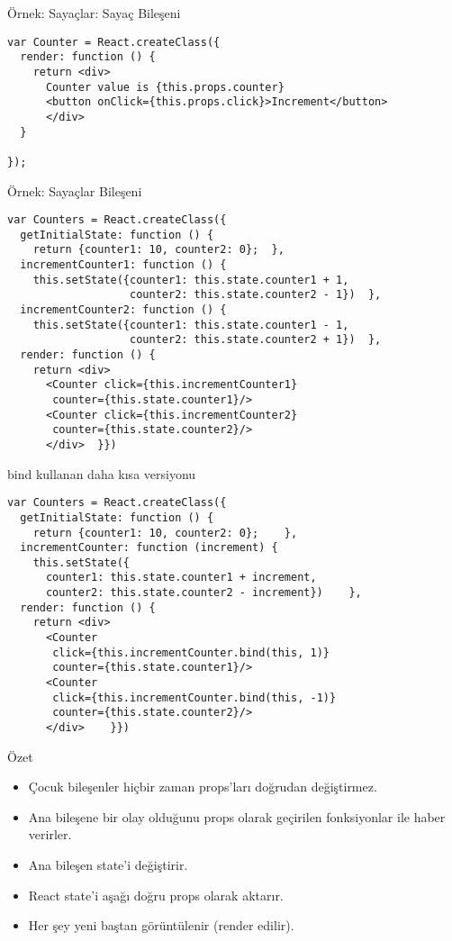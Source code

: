 \documentclass[presentation]{beamer}
\begin{document}
\begin{frame}[fragile,label=sec-5]{Örnek: Sayaçlar: Sayaç Bileşeni}
 \begin{verbatim}
var Counter = React.createClass({
  render: function () {
    return <div>
      Counter value is {this.props.counter}
      <button onClick={this.props.click}>Increment</button>
      </div>
  }

});
\end{verbatim}
\end{frame}

\begin{frame}[fragile,label=sec-6]{Örnek: Sayaçlar Bileşeni}
 \begin{verbatim}
var Counters = React.createClass({
  getInitialState: function () {
    return {counter1: 10, counter2: 0};  },
  incrementCounter1: function () {
    this.setState({counter1: this.state.counter1 + 1,
                   counter2: this.state.counter2 - 1})  },
  incrementCounter2: function () {
    this.setState({counter1: this.state.counter1 - 1,
                   counter2: this.state.counter2 + 1})  },
  render: function () {
    return <div>
      <Counter click={this.incrementCounter1}
       counter={this.state.counter1}/>
      <Counter click={this.incrementCounter2}
       counter={this.state.counter2}/>
      </div>  }})
\end{verbatim}
\end{frame}

\begin{frame}[fragile,label=sec-7]{bind kullanan daha kısa versiyonu}
 \begin{verbatim}
var Counters = React.createClass({
  getInitialState: function () {
    return {counter1: 10, counter2: 0};    },
  incrementCounter: function (increment) {
    this.setState({
      counter1: this.state.counter1 + increment,
      counter2: this.state.counter2 - increment})    },
  render: function () {
    return <div>
      <Counter
       click={this.incrementCounter.bind(this, 1)}
       counter={this.state.counter1}/>
      <Counter
       click={this.incrementCounter.bind(this, -1)}
       counter={this.state.counter2}/>
      </div>    }})
\end{verbatim}
\end{frame}


\begin{frame}[label=sec-8]{Özet}
\begin{itemize}
\item Çocuk bileşenler hiçbir zaman props'ları doğrudan değiştirmez.
\item Ana bileşene bir olay olduğunu props olarak geçirilen fonksiyonlar ile haber
verirler.
\item Ana bileşen state'i değiştirir.
\item React state'i aşağı doğru props olarak aktarır.
\item Her şey yeni baştan görüntülenir (render edilir).
\end{itemize}
\end{frame}
\end{document}
